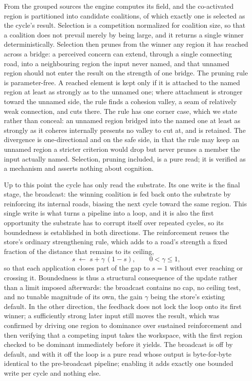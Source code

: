 \documentclass[11pt]{article}
\begin{document}
From the grouped sources the engine computes its field, and the co-activated region is
partitioned into candidate coalitions, of which exactly one is selected as the cycle's
result. Selection is a competition normalized for coalition size, so that a coalition
does not prevail merely by being large, and it returns a single winner
deterministically. Selection then prunes from the winner any region it has reached
across a bridge: a perceived concern can extend, through a single connecting road, into
a neighbouring region the input never named, and that unnamed region should not enter
the result on the strength of one bridge. The pruning rule is parameter-free. A reached
element is kept only if it is attached to the named region at least as strongly as to
the unnamed one; where attachment is stronger toward the unnamed side, the rule finds a
cohesion valley, a seam of relatively weak connection, and cuts there. The rule has one
corner case, which we state rather than conceal: an unnamed region bridged into the
named one at least as strongly as it coheres internally presents no valley to cut at,
and is retained. The divergence is one-directional and on the safe side, in that the
rule may keep an unnamed region a stricter criterion would drop but never prunes a
member the input actually named. Selection, pruning included, is a pure read; it is
verified as a mechanism and asserts nothing about cognition.

Up to this point the cycle has only read the substrate. Its one write is the final
stage, the broadcast: the winning coalition is fed back onto the substrate by
reinforcing its internal roads, biasing the next cycle toward the same region. This
single write is what turns a pipeline into a loop, and it is also the first opportunity
the substrate has to corrupt itself over repeated cycles, so its boundedness is
established in both directions. The reinforcement reuses the store's ordinary
strengthening rule, which adds to a road's strength a fixed fraction of the distance
that remains to its ceiling,
\[
  s \;\leftarrow\; s + \gamma\,(1 - s), \qquad 0 < \gamma \le 1,
\]
so that each application closes part of the gap to $s = 1$ without ever reaching or
crossing it. Boundedness is thus a structural consequence of the update rather than a
limit imposed afterwards: the broadcast contains no cap, no ceiling test, and no
tunable magnitude of its own, the gain $\gamma$ being the store's existing default. In
the other direction, the feedback does not lock the loop onto its first winner; a
sufficiently strong later input still moves the result, which was confirmed by driving
one region to dominance over sustained reinforcement and then verifying that a
competing input takes the workspace, with the first region checked to be dominant
immediately before it yields. The broadcast is off by default, and with it off the loop
is a pure read whose output is byte-for-byte identical to the pre-broadcast pipeline;
enabling it adds exactly one bounded write per cycle and nothing else.
\end{document}
